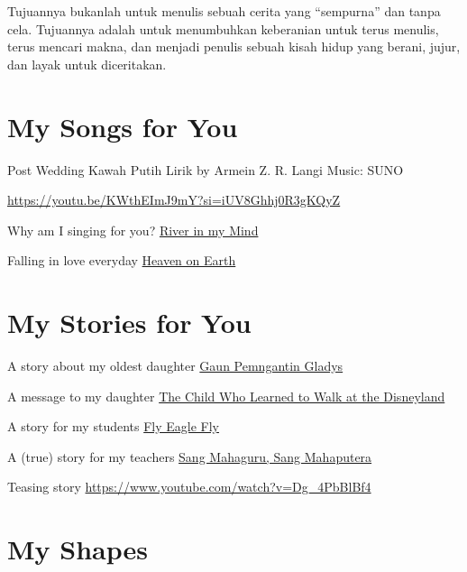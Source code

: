 \documentclass[
  letterpaper,
  DIV=11,
  numbers=noendperiod]{scrreprt}
\begin{document}
Tujuannya bukanlah untuk menulis sebuah cerita yang ``sempurna'' dan
tanpa cela. Tujuannya adalah untuk menumbuhkan keberanian untuk terus
menulis, terus mencari makna, dan menjadi penulis sebuah kisah hidup
yang berani, jujur, dan layak untuk diceritakan.


\chapter{My Songs for You}\label{my-songs-for-you}

Post Wedding Kawah Putih Lirik by Armein Z. R. Langi Music: SUNO

\url{https://youtu.be/KWthEImJ9mY?si=iUV8Ghhj0R3gKQyZ}

Why am I singing for you? \href{./Rivers\%20In\%20My\%20Mind.mp3}{River
in my Mind}

Falling in love everyday \href{./Heaven\%20on\%20Earth.mp3}{Heaven on
Earth}


\chapter{My Stories for You}\label{my-stories-for-you}

A story about my oldest daughter
\href{https://azrl.wordpress.com/2020/07/18/gaun-pengantin-gladys/\#comment-28004}{Gaun
Pemngantin Gladys}

A message to my daughter
\href{https://azrl.wordpress.com/2021/10/06/the-child-who-learned-to-walk-at-the-disneyland/}{The
Child Who Learned to Walk at the Disneyland}

A story for my students
\href{https://azrl.wordpress.com/2008/04/21/fly-my-eagle-fly/}{Fly Eagle
Fly}

A (true) story for my teachers
\href{\%3Chttps://azrl.wordpress.com/2012/11/28/perginya-sang-mahaputera-dan-mahaguru-berkemeja-putih/}{Sang
Mahaguru, Sang Mahaputera}

Teasing story \url{https://www.youtube.com/watch?v=Dg_4PbBlBf4}


\chapter{My Shapes}\label{my-shapes}

\end{document}
